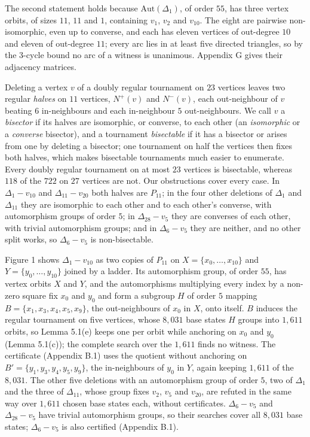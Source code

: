 \documentclass[
]{article}
\begin{document}
The second statement holds because \(\mathrm{Aut}(\Delta_1)\), of order
\(55\), has three vertex orbits, of sizes \(11\), \(11\) and \(1\),
containing \(v_1\), \(v_2\) and \(v_{10}\). The eight are pairwise
non-isomorphic, even up to converse, and each has eleven vertices of
out-degree \(10\) and eleven of out-degree \(11\); every arc lies in at
least five directed triangles, so by the \(3\)-cycle bound no arc of a
witness is unanimous. Appendix G gives their adjacency matrices.

Deleting a vertex \(v\) of a doubly regular tournament on \(23\)
vertices leaves two regular \emph{halves} on \(11\) vertices,
\(N^{+}(v)\) and \(N^{-}(v)\), each out-neighbour of \(v\) beating \(6\)
in-neighbours and each in-neighbour \(5\) out-neighbours. We call \(v\)
a \emph{bisector} if its halves are isomorphic, or converse, to each
other (an \emph{isomorphic} or a \emph{converse} bisector), and a
tournament \emph{bisectable} if it has a bisector or arises from one by
deleting a bisector; one tournament on half the vertices then fixes both
halves, which makes bisectable tournaments much easier to enumerate.
Every doubly regular tournament on at most \(23\) vertices is
bisectable, whereas \(118\) of the \(722\) on \(27\) vertices are not.
Our obstructions cover every case. In \(\Delta_1 - v_{10}\) and
\(\Delta_{11} - v_{20}\) both halves are \(P_{11}\); in the four other
deletions of \(\Delta_1\) and \(\Delta_{11}\) they are isomorphic to
each other and to each other's converse, with automorphism groups of
order \(5\); in \(\Delta_{28} - v_{5}\) they are converses of each
other, with trivial automorphism groups; and in \(\Delta_6 - v_{5}\)
they are neither, and no other split works, so \(\Delta_6 - v_{5}\) is
non-bisectable.

Figure 1 shows \(\Delta_1 - v_{10}\) as two copies of \(P_{11}\) on
\(X = \{x_0, \dots, x_{10}\}\) and \(Y = \{y_0, \dots, y_{10}\}\) joined
by a ladder. Its automorphism group, of order \(55\), has vertex orbits
\(X\) and \(Y\), and the automorphisms multiplying every index by a
non-zero square fix \(x_0\) and \(y_0\) and form a subgroup \(H\) of
order \(5\) mapping \(B = \{x_1, x_3, x_4, x_5, x_9\}\), the
out-neighbours of \(x_0\) in \(X\), onto itself. \(B\) induces the
regular tournament on five vertices, whose \(8{,}031\) base states \(H\)
groups into \(1{,}611\) orbits, so Lemma 5.1(e) keeps one per orbit
while anchoring on \(x_0\) and \(y_0\) (Lemma 5.1(c)); the complete
search over the \(1{,}611\) finds no witness. The certificate (Appendix
B.1) uses the quotient without anchoring on
\(B' = \{y_1, y_3, y_4, y_5, y_9\}\), the in-neighbours of \(y_0\) in
\(Y\), again keeping \(1{,}611\) of the \(8{,}031\). The other five
deletions with an automorphism group of order \(5\), two of \(\Delta_1\)
and the three of \(\Delta_{11}\), whose group fixes \(v_2\), \(v_5\) and
\(v_{20}\), are refuted in the same way over \(1{,}611\) chosen base
states each, without certificates. \(\Delta_6 - v_{5}\) and
\(\Delta_{28} - v_{5}\) have trivial automorphism groups, so their
searches cover all \(8{,}031\) base states; \(\Delta_6 - v_{5}\) is also
certified (Appendix B.1).
\end{document}
